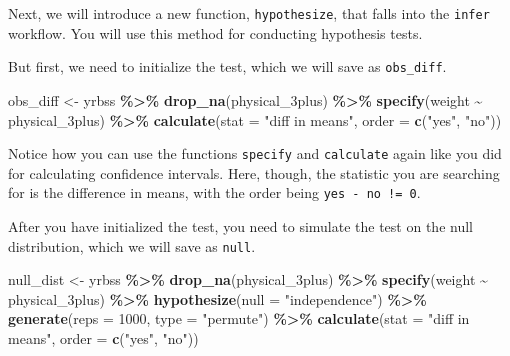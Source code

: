 \documentclass[
]{article}
\newenvironment{Shaded}{\begin{snugshade}}{\end{snugshade}}
\newcommand{\AttributeTok}[1]{\textcolor[rgb]{0.13,0.29,0.53}{#1}}
\newcommand{\DecValTok}[1]{\textcolor[rgb]{0.00,0.00,0.81}{#1}}
\newcommand{\FunctionTok}[1]{\textcolor[rgb]{0.13,0.29,0.53}{\textbf{#1}}}
\newcommand{\NormalTok}[1]{#1}
\newcommand{\OtherTok}[1]{\textcolor[rgb]{0.56,0.35,0.01}{#1}}
\newcommand{\SpecialCharTok}[1]{\textcolor[rgb]{0.81,0.36,0.00}{\textbf{#1}}}
\newcommand{\StringTok}[1]{\textcolor[rgb]{0.31,0.60,0.02}{#1}}
\begin{document}
Next, we will introduce a new function, \texttt{hypothesize}, that falls
into the \texttt{infer} workflow. You will use this method for
conducting hypothesis tests.

But first, we need to initialize the test, which we will save as
\texttt{obs\_diff}.

\begin{Shaded}
\begin{Highlighting}[]
\NormalTok{obs\_diff }\OtherTok{\textless{}{-}}\NormalTok{ yrbss }\SpecialCharTok{\%\textgreater{}\%}
  \FunctionTok{drop\_na}\NormalTok{(physical\_3plus) }\SpecialCharTok{\%\textgreater{}\%}
  \FunctionTok{specify}\NormalTok{(weight }\SpecialCharTok{\textasciitilde{}}\NormalTok{ physical\_3plus) }\SpecialCharTok{\%\textgreater{}\%}
  \FunctionTok{calculate}\NormalTok{(}\AttributeTok{stat =} \StringTok{"diff in means"}\NormalTok{, }\AttributeTok{order =} \FunctionTok{c}\NormalTok{(}\StringTok{"yes"}\NormalTok{, }\StringTok{"no"}\NormalTok{))}
\end{Highlighting}
\end{Shaded}

Notice how you can use the functions \texttt{specify} and
\texttt{calculate} again like you did for calculating confidence
intervals. Here, though, the statistic you are searching for is the
difference in means, with the order being \texttt{yes\ -\ no\ !=\ 0}.

After you have initialized the test, you need to simulate the test on
the null distribution, which we will save as \texttt{null}.

\begin{Shaded}
\begin{Highlighting}[]
\NormalTok{null\_dist }\OtherTok{\textless{}{-}}\NormalTok{ yrbss }\SpecialCharTok{\%\textgreater{}\%}
  \FunctionTok{drop\_na}\NormalTok{(physical\_3plus) }\SpecialCharTok{\%\textgreater{}\%}
  \FunctionTok{specify}\NormalTok{(weight }\SpecialCharTok{\textasciitilde{}}\NormalTok{ physical\_3plus) }\SpecialCharTok{\%\textgreater{}\%}
  \FunctionTok{hypothesize}\NormalTok{(}\AttributeTok{null =} \StringTok{"independence"}\NormalTok{) }\SpecialCharTok{\%\textgreater{}\%}
  \FunctionTok{generate}\NormalTok{(}\AttributeTok{reps =} \DecValTok{1000}\NormalTok{, }\AttributeTok{type =} \StringTok{"permute"}\NormalTok{) }\SpecialCharTok{\%\textgreater{}\%}
  \FunctionTok{calculate}\NormalTok{(}\AttributeTok{stat =} \StringTok{"diff in means"}\NormalTok{, }\AttributeTok{order =} \FunctionTok{c}\NormalTok{(}\StringTok{"yes"}\NormalTok{, }\StringTok{"no"}\NormalTok{))}
\end{Highlighting}
\end{Shaded}
\end{document}
